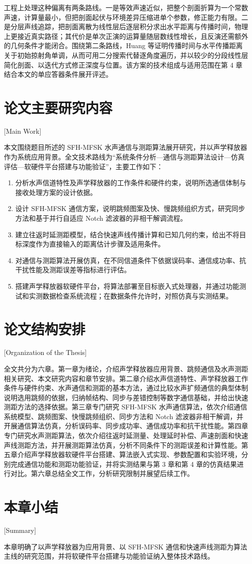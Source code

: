 工程上处理这种偏离有两条路线。一是等效声速近似，把整个剖面折算为一个常数声速，计算量最小，但把剖面起伏与环境差异压缩进单个参数，修正能力有限。二是分层声线追踪，把剖面离散为线性层后逐层积分求出水平距离与传播时间，物理上更接近真实路径；其代价是单次正演的运算量随层数线性增长，且反演还需额外的几何条件才能闭合。围绕第二条路线，Huang 等证明传播时间与水平传播距离关于初始掠射角单调，从而可用二分搜索代替逐角度遍历，并以较少的分段线性层简化剖面、以迭代方式修正深度与位置\cite{huangFastRaytracingbasedPrecise2024}。该方案的技术组成与适用范围在第 4 章结合本文的单应答器条件展开评述。

\section{论文主要研究内容}[Main Work]

本文围绕题目所述的 SFH-MFSK 水声通信与测距算法展开研究，并以声学释放器作为系统应用背景。全文技术路线为“系统条件分析—通信与测距算法设计—仿真评估—软硬件平台搭建与功能验证”，主要工作如下：

\begin{enumerate}
  \item 分析水声信道特性及声学释放器的工作条件和硬件约束，说明所选通信体制与接收处理方案的设计依据。
  \item 设计 SFH-MFSK 通信方案，说明跳频图案及快、慢跳频组织方式，研究同步方法和基于并行自适应 Notch 滤波器的非相干解调流程。
  \item 建立往返时延测距模型，结合快速声线传播计算和已知几何约束，给出不将目标深度作为直接输入的距离估计步骤及适用条件。
  \item 对通信与测距算法开展仿真，在不同信道条件下依据误码率、通信成功率、抗干扰性能及测距误差等指标进行评估。
  \item 搭建声学释放器软硬件平台，将算法部署至目标嵌入式处理器，并通过功能测试和实测数据检查系统流程；在数据条件允许时，对照仿真与实测结果。
\end{enumerate}

\section{论文结构安排}[Organization of the Thesis]

全文共分为六章。第一章为绪论，介绍声学释放器应用背景、跳频通信及水声测距相关研究、本文研究内容和章节安排。第二章介绍水声信道特性、声学释放器工作条件与硬件约束、水声通信和测距的基本方法，通过比较水声扩频通信的典型体制说明选用跳频的依据，归纳帧结构、同步与差错控制等数字通信基础，并给出快速测距方法的选择依据。第三章专门研究 SFH-MFSK 水声通信算法，依次介绍通信系统模型、跳频图案、快慢跳频组织、同步方法和 Notch 滤波器非相干解调，并开展通信算法仿真，分析误码率、同步成功率、通信成功率和抗干扰性能。第四章专门研究水声测距算法，依次介绍往返时延测量、处理延时补偿、声速剖面和快速声线测距方法，并开展测距算法仿真，分析不同条件下的测距误差和计算性能。第五章介绍声学释放器软硬件平台搭建、算法嵌入式实现、参数配置和实验环境，分别完成通信功能和测距功能验证，并将实测结果与第 3 章和第 4 章的仿真结果进行对比。第六章总结全文工作，分析研究限制并展望后续工作。

\section{本章小结}[Summary]

本章明确了以声学释放器为应用背景、以 SFH-MFSK 通信和快速声线测距为算法主线的研究范围，并将软硬件平台搭建与功能验证纳入整体技术路线。